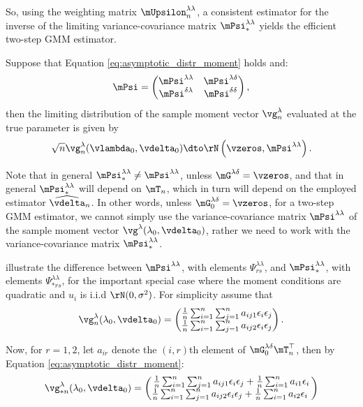 So, using the weighting matrix $\mUpsilon_n^{\lambda\lambda}$, a consistent estimator for the inverse of the limiting variance-covariance matrix $\mPsi_{*}^{\lambda\lambda}$ yields the efficient two-step GMM estimator.

Suppose that Equation \eqref{eq:asymptotic_distr_moment} holds and:
\begin{equation*}
	\mPsi = \begin{pmatrix}
	\mPsi^{\lambda\lambda} & \mPsi^{\lambda\delta} \\
	\mPsi^{\delta\lambda} & \mPsi^{\delta\delta}
	\end{pmatrix},
\end{equation*}
%
then the limiting distribution of the sample moment vector $\vg_n^{\lambda}$ evaluated at the true parameter is given by
\begin{equation*}
\sqrt{n}\vg_{n}^{\lambda}(\vlambda_0, \vdelta_0)\dto \rN\left(\vzeros, \mPsi^{\lambda\lambda}\right).
\end{equation*}

Note that in general $\mPsi_{*}^{\lambda\lambda}\neq \mPsi^{\lambda\lambda}$, unless $\mG^{\lambda\delta} = \vzeros$, and that in general $\mPsi_{*}^{\lambda\lambda}$ will depend on $\mT_n$, which in turn will depend on the employed estimator $\widehat{\vdelta}_n$. In other words, unless $\mG^{\lambda\delta}_0 = \vzeros$, for a two-step GMM estimator, we cannot simply use the variance-covariance matrix $\mPsi^{\lambda\lambda}$ of the sample moment vector $\vg^{\lambda}(\lambda_0, \vdelta_0)$, rather we need to work with the variance-covariance matrix $\mPsi_{*}^{\lambda\lambda}$.

\cite{pruchaHB} illustrate the difference between $\mPsi^{\lambda\lambda}$, with elements $\Psi_{rs}^{\lambda\lambda}$, and $\mPsi_{*}^{\lambda\lambda}$, with elements $\Psi_{*rs}^{\lambda\lambda}$, for the important special case where the moment conditions are quadratic and $u_i$ is i.i.d $\rN(0, \sigma^2)$. For simplicity assume that
\begin{equation*}
\vg_n^{\lambda}(\lambda_0, \vdelta_0) = \begin{pmatrix}
\frac{1}{n}\sum_{i = 1} ^n\sum_{j = 1} ^na_{ij1}\epsilon_i \epsilon_j \\
\frac{1}{n}\sum_{i = 1} ^n\sum_{j = 1} ^na_{ij2} \epsilon_i \epsilon_j
\end{pmatrix}.
\end{equation*}

Now, for $r = 1,2$, let $a_{ir}$ denote the $(i,r)$th element of $\mG^{\lambda\delta}_0\mT_n^\top$, then by Equation \eqref{eq:asymptotic_distr_moment}:
\begin{equation*}
\vg_{*n}^{\lambda}(\lambda_0, \vdelta_0) = \begin{pmatrix}
\frac{1}{n}\sum_{i = 1} ^n\sum_{j = 1} ^na_{ij1}\epsilon_i \epsilon_j + \frac{1}{n}\sum_{i=1}^na_{i1}\epsilon_i\\
\frac{1}{n}\sum_{i = 1} ^n\sum_{j = 1} ^na_{ij2}\epsilon_i \epsilon_j + \frac{1}{n}\sum_{i=1}^na_{i2}\epsilon_i\
\end{pmatrix}
\end{equation*}

